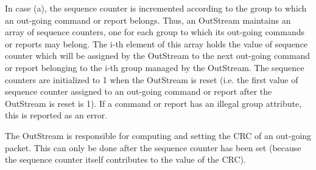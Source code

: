 In case (a), the sequence counter is incremented according to the group to which an out-going command or report belongs. Thus, an OutStream maintains an array of sequence counters, one for each group to which its out-going commands or reports may belong. The i-th element of this array holds the value of sequence counter which will be assigned by the OutStream to the next out-going command or report belonging to the i-th group managed by the OutStream. The sequence counters are initialized to 1 when the OutStream is reset (i.e. the first value of sequence counter assigned to an out-going command or report after the OutStream is reset is 1). If a command or report has an illegal group attribute, this is reported as an error.

The OutStream is responsible for computing and setting the CRC of an out-going packet. This can only be done after the sequence counter has been set (because the sequence counter itself contributes to the value of the CRC).
 
